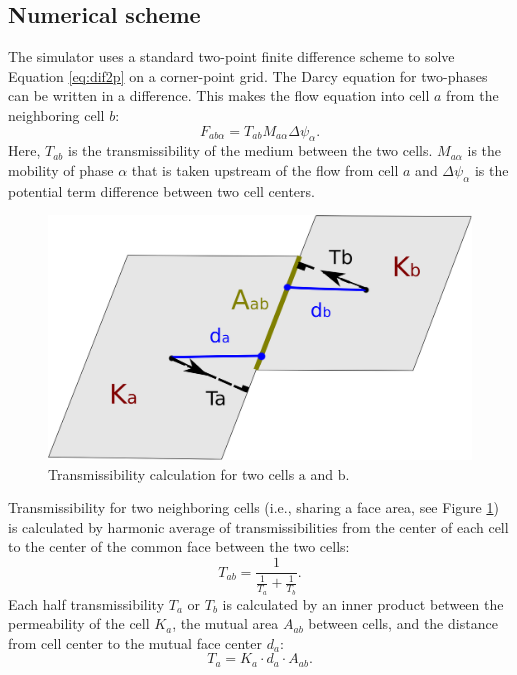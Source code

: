 \subsection{Numerical scheme}

The simulator uses a standard two-point finite difference scheme to solve
Equation \ref{eq:dif2p} on a corner-point grid. The Darcy equation for two-phases can be written in a difference. This makes the flow equation into cell $a$ from the
neighboring cell $b$:
\begin{equation}
 F_{ab\alpha}=T_{ab}M_{a\alpha}\Delta \psi_{\alpha}.
\label{eq:eclF}
\end{equation} Here, $T_{ab}$ is the transmissibility of the medium between the two cells. $M_{a\alpha}$ is the mobility of phase $\alpha$ that is taken upstream of the flow from cell ${a}$ and $\Delta \psi_{\alpha}$ is the potential term difference between two cell centers. 


\begin{figure}
 \centering{}
 \includegraphics[width=0.4\linewidth]{./figurer/trans}
 \caption{Transmissibility calculation for two cells $\mbox{a}$ and $\mbox{b}$.}
 \label{fig:tran}
\end{figure}

Transmissibility for two neighboring cells (i.e., sharing a face area, see
Figure \ref{fig:tran}) is
calculated by harmonic average of transmissibilities from the center of each
cell to the center of the common face between the two cells:
\begin{equation}
 T_{ab}=\frac{1}{\frac{1}{T_a}+\frac{1}{T_b}}.
 \label{eq:Thav}
\end{equation} Each half transmissibility $T_{a}$ or $T_{b}$ is calculated by an inner product
between the permeability of the cell $K_a $, the mutual area $A_{ab}$ between cells, and the distance from cell center to the mutual face center $d_a$:
\begin{equation}
  T_a = K_a \cdot d_a \cdot A_{ab}.
  \label{eq:tran}
\end{equation}

